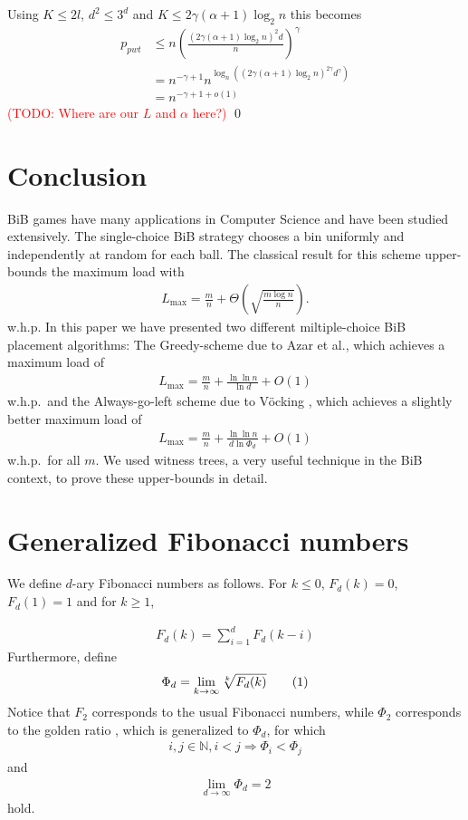 \documentclass[a4paper,12pt]{article}
\newcommand\todo[1]{\textcolor{red}{(TODO: #1)}}
\newcommand\load{L_{\mathrm{max}}}
\newcommand\numberthis{\addtocounter{equation}{1}\tag{\theequation}}
\newcommand\neqn[1]{\numberthis\label{eqn:#1}}
\begin{document}
Using $K \leq 2l$, $d^2 \leq 3^d$ and $K \leq 2\gamma  \left( \alpha +1 \right)  \log_2 n$ this becomes
\begin{align*}
p_{pwt} &\leq n \left(\frac{\left(2\gamma  \left(\alpha +1 \right)  \log_2 n\right)^2 d}{n}\right)^\gamma \\
        &= n^{-\gamma +1}  n ^{\log_n\left( \left(2\gamma \left(\alpha+1\right) \log_2n \right)^{2\gamma}  d^\gamma \right)}\\
        &= n^{-\gamma+1+o\left(1\right)}
\end{align*}
\todo{Where are our $L$ and $\alpha$ here?}
\qed
 
\section{Conclusion}
\label{sec:conclusion}
BiB games have many applications in Computer Science and have been studied extensively. The single-choice BiB strategy chooses a bin uniformly and independently at random for each ball. The classical result for this scheme upper-bounds the maximum load with 
\begin{align*}
\load = \frac{m}{n} + \Theta\left(\sqrt{\frac{m  \log n}{n}}\right).
\end{align*}
w.h.p.
In this paper we have presented two different miltiple-choice BiB placement algorithms: The Greedy-scheme due to Azar et al.\cite{ABKU99}, which achieves a maximum load of 
\begin{align*}
\load = \frac{m}{n} + \frac{\ln\ln n}{\ln d} + O(1)
\end{align*}
w.h.p.~and the Always-go-left scheme due to V\"ocking \cite{VOC03}, which achieves a slightly better maximum load of
\begin{align*}
\load = \frac{m}{n} + \frac{\ln \ln n}{d \ln \Phi_d} + O(1)
\end{align*}
w.h.p.~for all $m$. We used witness trees, a very useful technique in the BiB context, to prove these upper-bounds in detail.


\appendix
\section{Generalized Fibonacci numbers}
\label{sec:fibonacci}
We define $d$-ary Fibonacci numbers as follows. For $k \leq0$, $F_d(k) = 0$, $F_d(1) = 1$ and for $k \geq 1$,

\begin{align*}
F_d(k) = \sum_{i=1}^{d}F_d(k-i)
\end{align*}
Furthermore, define 
\begin{align*}
\Phi_d = \lim_{k \rightarrow \infty} \sqrt[k]{F_d(k)} \neqn{goldenFib}
\end{align*}
Notice that $F_2$ corresponds to the usual Fibonacci numbers, while $\Phi_2 $ corresponds to the golden ratio \cite{Knuth73}, which is generalized to $\Phi_d$, for which 
\begin{align*}
i, j \in \mathbb{N}, i < j \Rightarrow \Phi_i < \Phi_j
\end{align*}
and 
\begin{align*}
\lim_{d\rightarrow \infty} \Phi_d = 2
\end{align*}
hold.
\end{document}
